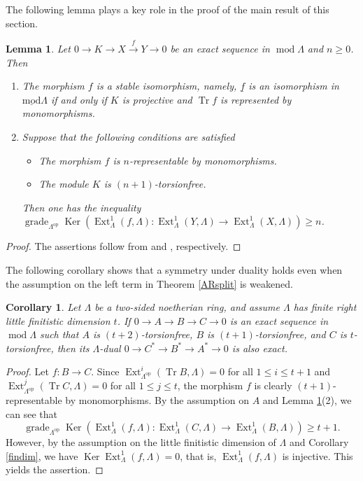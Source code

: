 \documentclass{amsart}
\newtheorem{lem}[thm]{Lemma}
\newtheorem{cor}[thm]{Corollary}
\theoremstyle{definition}
\theoremstyle{remark}
\numberwithin{equation}{thm}
\def\Ext{\operatorname{Ext}}
\def\ge{\geqslant}
\def\grade{\operatorname{grade}}
\def\Ker{\operatorname{Ker}}
\def\le{\leqslant}
\def\lmod{\operatorname{\underline{mod}}}
\def\mod{\operatorname{mod}}
\def\tr{\operatorname{Tr}}
\begin{document}
The following lemma plays a key role in the proof of the main result of this section.

\begin{lem}\label{tncor}
Let $0\to K\to X\xrightarrow{f}Y\to0$ be an exact sequence in $\mod\Lambda$ and $n\ge0$. Then
\begin{enumerate}[\rm(1)]
   \item The morphism $f$ is a stable isomorphism, namely, $\underline{f}$ is an isomorphism in $\lmod\Lambda$ if and only if $K$ is projective and $\tr f$ is represented by monomorphisms.
   \item Suppose that the following conditions are satisfied
   \begin{itemize}
      \item The morphism $f$ is $n$-representable by monomorphisms.
      \item The module $K$ is $(n+1)$-torsionfree.
   \end{itemize}
   Then one has the inequality $\grade_{\Lambda^{\mathrm{op}}}\Ker(\Ext^1_\Lambda(f,\Lambda):\Ext^1_\Lambda(Y,\Lambda)\to\Ext^1_\Lambda(X,\Lambda))\ge n$.
\end{enumerate}
\end{lem}

\begin{proof}
The assertions follow from \cite[Lemma 3.5(1)]{Omorp} and \cite[Theorem 3.6]{Omorp}, respectively.
\end{proof}

The following corollary shows that a symmetry under duality holds even when the assumption on the left term in Theorem \ref{ARsplit} is weakened.

\begin{cor}\label{210}
Let $\Lambda$ be a two-sided noetherian ring, and assume $\Lambda$ has finite right little finitistic dimension $t$.
If $0\to A\to B\to C\to0$ is an exact sequence in $\mod\Lambda$ such that $A$ is $(t+2)$-torsionfree, $B$ is $(t+1)$-torsionfree, and $C$ is $t$-torsionfree, then its $\Lambda$-dual $0\to C^\ast\to B^\ast\to A^\ast\to0$ is also exact.
\end{cor}

\begin{proof}
Let $f:B\to C$. Since $\Ext^i_{\Lambda^{\mathrm{op}}}(\tr B,\Lambda)=0$ for all $1\le i\le t+1$ and $\Ext^j_{\Lambda^{\mathrm{op}}}(\tr C,\Lambda)=0$ for all $1\le j\le t$, the morphism $f$ is clearly $(t+1)$-representable by monomorphisms. By the assumption on $A$ and Lemma \ref{tncor}(2), we can see that $$\grade_{\Lambda^{\mathrm{op}}}\Ker(\Ext^1_\Lambda(f,\Lambda):\Ext^1_\Lambda(C,\Lambda)\to\Ext^1_\Lambda(B,\Lambda))\ge t+1.$$
However, by the assumption on the little finitistic dimension of $\Lambda$ and Corollary \ref{findim}, we have $\Ker\Ext^1_\Lambda(f,\Lambda)=0$, that is, $\Ext^1_\Lambda(f,\Lambda)$ is injective. This yields the assertion.
\end{proof}
\end{document}
